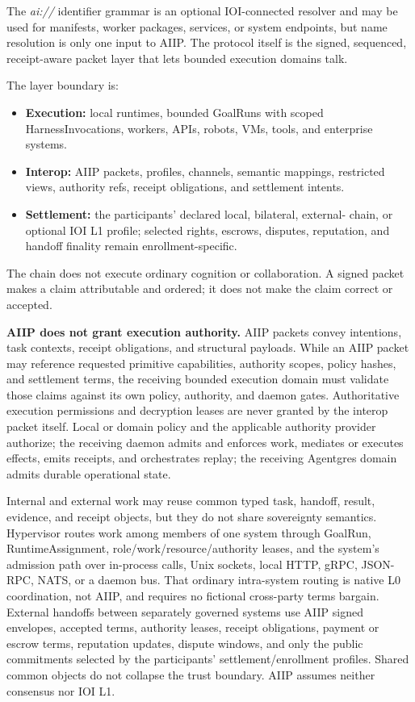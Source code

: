 \documentclass[
  11pt,
]{article}
\providecommand{\tightlist}{%
  \setlength{\itemsep}{0pt}\setlength{\parskip}{0pt}}
\begin{document}
The \emph{ai://} identifier grammar is an optional IOI-connected resolver and
may be used for manifests, worker
packages, services, or system endpoints, but name resolution is only one
input to AIIP. The protocol itself is the signed, sequenced,
receipt-aware packet layer that lets bounded execution domains talk.

The layer boundary is:

\begin{itemize}
\tightlist
\item
  \textbf{Execution:} local runtimes, bounded GoalRuns with scoped
  HarnessInvocations, workers, APIs, robots, VMs, tools, and enterprise systems.
\item
  \textbf{Interop:} AIIP packets, profiles, channels, semantic mappings,
  restricted views, authority refs, receipt obligations, and settlement
  intents.
\item
  \textbf{Settlement:} the participants' declared local, bilateral, external-
  chain, or optional IOI L1 profile; selected rights, escrows, disputes,
  reputation, and handoff finality remain enrollment-specific.
\end{itemize}

The chain does not execute ordinary cognition or collaboration. A signed
packet makes a claim attributable and ordered; it does not make the claim
correct or accepted.

\textbf{AIIP does not grant execution authority.} AIIP packets convey
intentions, task contexts, receipt obligations, and structural payloads.
While an AIIP packet may reference requested primitive capabilities,
authority scopes, policy hashes, and settlement terms, the receiving
bounded execution domain must validate those claims against its own
policy, authority, and daemon gates. Authoritative execution permissions and
decryption leases are never granted by the interop packet itself. Local or
domain policy and the applicable authority provider authorize; the receiving
daemon admits and enforces work, mediates or executes effects, emits receipts,
and orchestrates replay; the receiving Agentgres domain admits durable
operational state.

Internal and external work may reuse common typed task, handoff, result,
evidence, and receipt objects, but they do not share sovereignty semantics.
Hypervisor routes work among members of one system through GoalRun,
RuntimeAssignment, role/work/resource/authority leases, and the system's
admission path over in-process calls, Unix sockets, local HTTP, gRPC, JSON-RPC,
NATS, or a daemon bus. That ordinary intra-system routing is native L0
coordination, not AIIP, and requires no fictional cross-party terms bargain.
External handoffs between separately governed systems use AIIP signed envelopes,
accepted terms, authority leases, receipt obligations, payment or escrow terms,
reputation updates, dispute windows, and only the public commitments selected by
the participants' settlement/enrollment profiles. Shared common objects do not
collapse the trust boundary. AIIP assumes neither consensus nor IOI L1.
\end{document}

